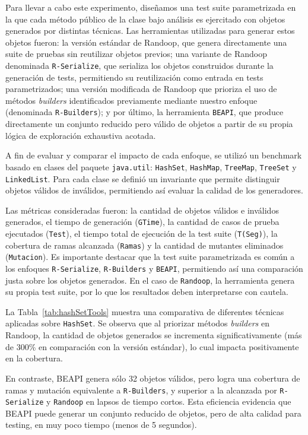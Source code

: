 Para llevar a cabo este experimento, diseñamos una test suite parametrizada en la que cada método 
público de la clase bajo análisis es ejercitado con objetos generados por distintas técnicas. Las 
herramientas utilizadas para generar estos objetos fueron: la versión estándar de Randoop, que 
genera directamente una suite de pruebas sin reutilizar objetos previos; una variante de Randoop 
denominada \texttt{R-Serialize}, que serializa los objetos construidos durante la generación de 
tests, permitiendo su reutilización como entrada en tests parametrizados; una versión modificada 
de Randoop que prioriza el uso de métodos \emph{builders} identificados previamente mediante 
nuestro enfoque (denominada \texttt{R-Builders}); y por último, la herramienta \texttt{BEAPI}, que 
produce directamente un conjunto reducido pero válido de objetos a partir de su propia lógica de 
exploración exhaustiva acotada.

A fin de evaluar y comparar el impacto de cada enfoque, se utilizó un benchmark basado en clases 
del paquete \texttt{java.util}: \texttt{HashSet}, \texttt{HashMap}, \texttt{TreeMap}, 
\texttt{TreeSet} y \texttt{LinkedList}. Para cada clase se definió un invariante que permite 
distinguir objetos válidos de inválidos, permitiendo así evaluar la calidad de los generadores.

Las métricas consideradas fueron: la cantidad de objetos válidos e inválidos generados, el tiempo 
de generación (\texttt{GTime}), la cantidad de casos de prueba ejecutados (\texttt{Test}), el 
tiempo total de ejecución de la test suite (\texttt{T(Seg)}), la cobertura de ramas alcanzada 
(\texttt{Ramas}) y la cantidad de mutantes eliminados (\texttt{Mutacion}). Es importante destacar 
que la test suite parametrizada es común a los enfoques \texttt{R-Serialize}, \texttt{R-Builders} 
y \texttt{BEAPI}, permitiendo así una comparación justa sobre los objetos generados. En el caso de 
\texttt{Randoop}, la herramienta genera su propia test suite, por lo que los resultados deben 
interpretarse con cautela.



La Tabla~\ref{tab:hashSetTools} muestra una comparativa de diferentes técnicas aplicadas sobre 
\texttt{HashSet}. Se observa que al priorizar métodos \emph{builders} en Randoop, la cantidad de 
objetos generados se incrementa significativamente (más de 300\% en comparación con la versión 
estándar), lo cual impacta positivamente en la cobertura.

En contraste, \textsf{BEAPI} genera sólo 32 objetos válidos, pero logra una cobertura de ramas y 
mutación equivalente a \texttt{R-Builders}, y superior a la alcanzada por \texttt{R-Serialize} y 
\texttt{Randoop} en lapsos de tiempo cortos. Esta eficiencia evidencia que BEAPI puede generar un 
conjunto reducido de objetos, pero de alta calidad para testing, en muy poco tiempo (menos de 5 
segundos).

